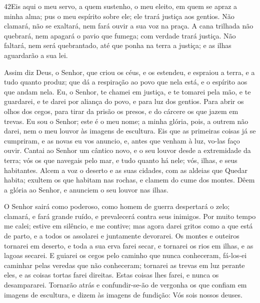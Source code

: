 \medskip

\lettrine{42}{}Eis aqui o meu servo, a quem sustenho, o meu
eleito, em quem se apraz a minha alma; pus o meu espírito sobre ele;
ele trará justiça aos gentios. Não clamará, não se exaltará, nem
fará ouvir a sua voz na praça. A cana trilhada não quebrará, nem
apagará o pavio que fumega; com verdade trará justiça. Não
faltará, nem será quebrantado, até que ponha na terra a justiça; e
as ilhas aguardarão a sua lei.

Assim diz Deus, o Senhor, que criou os céus, e os estendeu, e
espraiou a terra, e a tudo quanto produz; que dá a respiração ao
povo que nela está, e o espírito aos que andam nela. Eu, o
Senhor, te chamei em justiça, e te tomarei pela mão, e te guardarei,
e te darei por aliança do povo, e para luz dos gentios. Para
abrir os olhos dos cegos, para tirar da prisão os presos, e do
cárcere os que jazem em trevas. Eu sou o Senhor; este é o meu
nome; a minha glória, pois, a outrem não darei, nem o meu louvor às
imagens de escultura. Eis que as primeiras coisas já se
cumpriram, e as novas eu vos anuncio, e, antes que venham à luz,
vo-las faço ouvir. Cantai ao Senhor um cântico novo, e o seu
louvor desde a extremidade da terra; vós os que navegais pelo mar, e
tudo quanto há nele; vós, ilhas, e seus habitantes. Alcem a
voz o deserto e as suas cidades, com as aldeias que Quedar habita;
exultem os que habitam nas rochas, e clamem do cume dos montes.
Dêem a glória ao Senhor, e anunciem o seu louvor nas ilhas.

O Senhor sairá como poderoso, como homem de guerra despertará o
zelo; clamará, e fará grande ruído, e prevalecerá contra seus
inimigos. Por muito tempo me calei; estive em silêncio, e me
contive; mas agora darei gritos como a que está de parto, e a todos
os assolarei e juntamente devorarei. Os montes e outeiros
tornarei em deserto, e toda a sua erva farei secar, e tornarei os
rios em ilhas, e as lagoas secarei. E guiarei os cegos pelo
caminho que nunca conheceram, fá-los-ei caminhar pelas veredas que
não conheceram; tornarei as trevas em luz perante eles, e as coisas
tortas farei direitas. Estas coisas lhes farei, e nunca os
desampararei. Tornarão atrás e confundir-se-ão de vergonha os
que confiam em imagens de escultura, e dizem às imagens de fundição:
Vós sois nossos deuses.

